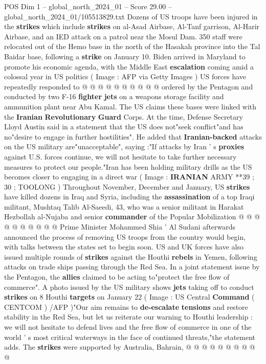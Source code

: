 \begin{textsample}{POS Dim 1 – global\_north\_2024\_01 – Score 29.00 – global\_north\_2024\_01/105513829.txt}
Dozens of US troops have been injured in the \textbf{strikes} which include \textbf{strikes} on al-Asad Airbase, Al-Tanf garrison, Al-Harir Airbase, and an IED attack on a patrol near the Mosul Dam. 350 staff were relocated out of the Hemo base in the north of the Hasakah province into the Tal Baidar base, following a \textbf{strike} on January 10.
Biden arrived in Maryland to promote his economic agenda, with the Middle East \textbf{escalation} coming amid a colossal year in US politics ( Image : AFP via Getty Images ) US forces have repeatedly responded to @ @ @ @ @ @ @ @ @ @ ordered by the Pentagon and conducted by two F-16 \textbf{fighter} \textbf{jets} on a weapons storage facility and ammunition plant near Abu Kamal.
The US claims these bases were linked with the \textbf{Iranian} \textbf{Revolutionary} \textbf{Guard} Corps.
At the time, Defense Secretary Lloyd Austin said in a statement that the US does not"seek conflict"and has no"desire to engage in further hostilities".
He added that \textbf{Iranian-backed} attacks on the US military are"unacceptable", saying :"If attacks by Iran ' s \textbf{proxies} against U.S. forces continue, we will not hesitate to take further necessary measures to protect our people."Iran has been holding military drills as the US becomes closer to engaging in a direct war ( Image : \textbf{IRANIAN} ARMY **39 ; 30 ; TOOLONG ) Throughout November, December and January, US \textbf{strikes} have killed dozens in Iraq and Syria, including the \textbf{assassination} of a top Iraqi militant, Mushtaq Talib Al-Saeedi, 43, who was a senior militant in Harakat Hezbollah al-Nujaba and senior \textbf{commander} of the Popular Mobilization @ @ @ @ @ @ @ @ @ @ Prime Minister Mohammed Shia ' Al Sudani afterwards announced the process of removing US troops from the country would begin, with talks between the states set to begin soon.
US and UK forces have also issued multiple rounds of \textbf{strikes} against the Houthi \textbf{rebels} in Yemen, following attacks on trade ships passing through the Red Sea.
In a joint statement issue by the Pentagon, the \textbf{allies} claimed to be acting to"protect the free flow of commerce".
A photo issued by the US military shows \textbf{jets} taking off to conduct \textbf{strikes} on 8 Houthi \textbf{targets} on January 22 ( Image : US Central \textbf{Command} ( CENTCOM ) /AFP )"Our aim remains to \textbf{de-escalate} \textbf{tensions} and restore stability in the Red Sea, but let us reiterate our warning to Houthi leadership : we will not hesitate to defend lives and the free flow of commerce in one of the world ' s most critical waterways in the face of continued threats,"the statement adds.
The \textbf{strikes} were supported by Australia, Bahrain, @ @ @ @ @ @ @ @ @ @

\end{textsample}
